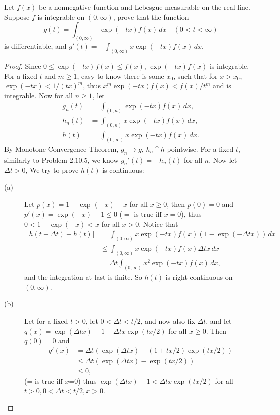 \begin{pro}%
	Let $f(x)$ be a nonnegative function and Lebesgue measurable on the real line. Suppose $f$ is integrable on $(0,\infty)$, prove that the function
	\[g(t)=\int_{(0,\infty)} \exp(-tx) f(x)\,dx\quad(0<t<\infty)\]
	is differentiable, and $g'(t)=-\int_{(0,\infty)} x\exp(-tx)f(x)\,dx$.
\end{pro}
\begin{proof}
	Since $0\leq\exp(-tx)f(x)\leq f(x)$, $\exp(-tx)f(x)$ is integrable. For a fixed $t$ and $m\geq 1$, easy to know there is some $x_0$, such that for $x>x_0$, $\exp(-tx)<1/(tx)^m$, thus $x^m \exp(-tx)f(x)<f(x)/t^m$ and is integrable. Now for all $n\geq 1$, let
	\begin{align*}
	g_n(t)&=\int_{(0,n)} \exp(-tx)f(x)\,dx,\\
	h_n(t)&=\int_{(0,n)} x\exp(-tx)f(x)\,dx,\\
	h(t)&=\int_{(0,\infty)} x\exp(-tx)f(x)\,dx.
	\end{align*}
	By Monotone Convergence Theorem, $g_n\to g$, $h_n\uparrow h$ pointwise. For a fixed $t$, similarly to Problem $2.10.5$, we know $g_n'(t)=-h_n(t)$ for all $n$. Now let $\Delta t>0$, We try to prove $h(t)$ is continuous:
	\begin{description}
	\item[(a)] Let $p(x)=1-\exp(-x)-x$ for all $x\geq 0$, then $p(0)=0$ and $p'(x)=\exp(-x)-1\leq 0$ ($=$ is true iff $x=0$), thus $0<1-\exp(-x)<x$ for all $x>0$. Notice that
	\begin{align*}
	|h(t+\Delta t)-h(t)|&=\int_{(0,\infty)} x\exp(-tx)f(x)(1-\exp(-\Delta tx))\,dx\\
	&\leq \int_{(0,\infty)} x\exp(-tx)f(x)\Delta tx\,dx\\
	&=\Delta t\int_{(0,\infty)} x^2\exp(-tx)f(x)\,dx,
	\end{align*}
	and the integration at last is finite. So $h(t)$ is right continuous on $(0,\infty)$.
	\item[(b)] Let for a fixed $t>0$, let $0<\Delta t<t/2$, and now also fix $\Delta t$, and let $q(x)=\exp(\Delta tx)-1-\Delta tx\exp(tx/2)$ for all $x\geq 0$. Then $q(0)=0$ and
	\begin{align*} 
	q'(x)&=\Delta t(\exp(\Delta tx)-(1+tx/2)\exp(tx/2))\\
	&\leq \Delta t(\exp(\Delta tx)-\exp(tx/2))\\
	&\leq 0,
	\end{align*}
	(= is true iff $x$=0) thus $\exp(\Delta tx)-1<\Delta tx\exp(tx/2)$ for all $t>0,0<\Delta t<t/2, x>0$.

\end{description}
\end{proof}
